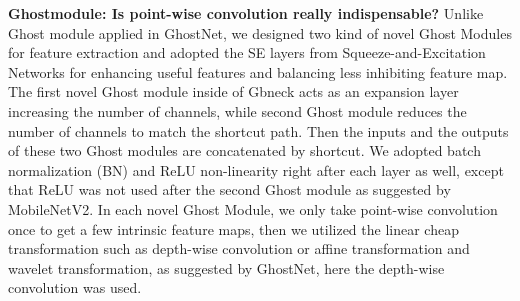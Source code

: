 \textbf{Ghostmodule: Is point-wise convolution really indispensable?} Unlike Ghost module applied in GhostNet\cite{b19}, we designed two kind of novel Ghost Modules for feature extraction and adopted the SE layers from Squeeze-and-Excitation Networks \cite{b24} for enhancing useful features and balancing less inhibiting feature map. The first novel Ghost module inside of Gbneck acts as an expansion layer increasing the number of channels, while second Ghost module reduces the number of channels to match the shortcut path. Then the inputs and the outputs of these two Ghost modules are concatenated by shortcut. We adopted batch normalization (BN) and ReLU non-linearity right after each layer as well\cite{b19}, except that ReLU was not used after the second Ghost module as suggested by MobileNetV2\cite{b30}. In each novel Ghost Module, we only take point-wise convolution once to get a few intrinsic feature maps, then we utilized the linear cheap transformation such as depth-wise convolution or affine transformation and wavelet transformation, as suggested by GhostNet\cite{b19}, here the depth-wise convolution was used.

